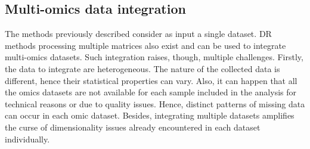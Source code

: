 

\subsection{Multi-omics data integration} 

The methods previously described consider as input a single dataset. \gls{DR} methods processing multiple matrices also exist and can be used to integrate multi-omics datasets. Such integration raises, though, multiple challenges. Firstly, the data to integrate are heterogeneous. The nature of the collected data is different, hence their statistical properties can vary. Also, it can happen that all the omics datasets are not available for each sample included in the analysis for technical reasons or due to quality issues. Hence, distinct patterns of missing data can occur in each omic dataset. Besides, integrating multiple datasets amplifies the curse of dimensionality issues already encountered in each dataset individually.

